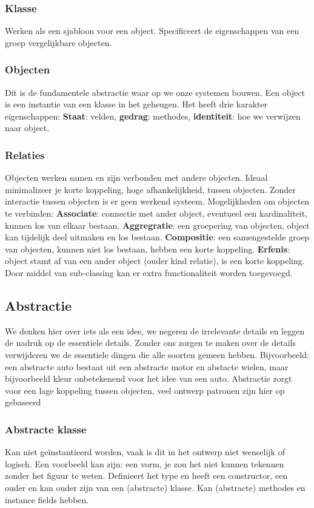 \subsubsection{Klasse}
Werken als een sjabloon voor een object.
Specificeert de eigenschappen van een groep vergelijkbare objecten.

\subsubsection{Objecten}
Dit is de fundamentele abstractie waar op we onze systemen bouwen.
Een object is een instantie van een klasse in het geheugen.
Het heeft drie karakter eigenschappen: \textbf{Staat}: velden, \textbf{gedrag}: methodes, \textbf{identiteit}: hoe we verwijzen naar object.

\subsubsection{Relaties}
Objecten werken samen en zijn verbonden met andere objecten.
Ideaal minimalizeer je korte koppeling, hoge afhankelijkheid, tussen objecten.
Zonder interactie tussen objecten is er geen werkend systeem.
Mogelijkheden om objecten te verbinden:
\textbf{Associate}: connectie met ander object, eventueel een kardinaliteit, kunnen los van elkaar bestaan.
\textbf{Aggregratie}: een groepering van objecten, object kan tijdelijk deel uitmaken en los bestaan.
\textbf{Compositie}: een samengestelde groep van objecten, kunnen niet los bestaan, hebben een korte koppeling.
\textbf{Erfenis}: object stamt af van een ander object (ouder kind relatie), is een korte koppeling.
Door middel van sub-classing kan er extra functionaliteit worden toegevoegd.

\subsection{Abstractie}
We denken hier over iets als een idee, we negeren de irrelevante details en leggen de nadruk op de essentiele details.
Zonder ons zorgen te maken over de details verwijderen we de essentiele dingen die alle soorten gemeen hebben.
Bijvoorbeeld: een abstracte auto bestaat uit een abstracte motor en abstacte wielen, maar bijvoorbeeld kleur onbetekenend voor het idee van een auto.
Abstractie zorgt voor een lage koppeling tussen objecten, veel ontwerp patronen zijn hier op gebaseerd

\subsubsection{Abstracte klasse}
Kan niet geïnstantieerd worden, vaak is dit in het ontwerp niet wenselijk of logisch.
Een voorbeeld kan zijn: een vorm, je zou het niet kunnen tekennen zonder het figuur te weten.
Definieert het type en heeft een constructor, een ouder en kan ouder zijn van een (abstracte) klasse.
Kan (abstracte) methodes en instance fields hebben.

